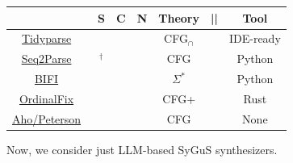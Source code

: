 \documentclass[runningheads]{llncs}
\newcommand{\cmark}{\ding{51}}%
\newcommand{\xmark}{\ding{55}}%
\begin{document}
\newcommand{\tidyparse}{\href{https://arxiv.org/pdf/2408.01849}{Tidyparse}~\cite{considine2023pragmatic}}
\newcommand{\seqtoparse}{\href{https://pg.ucsd.edu/publications/Seq2Parse-neurosymbolic-parse-error-repair_OOPSLA-2022.pdf}{Seq2Parse}~\cite{sakkas2022seq2parse}}
\newcommand{\bifi}{\href{https://arxiv.org/pdf/2106.06600}{BIFI}~\cite{yasunaga2021break}}
\newcommand{\ordinalfix}{\href{https://arxiv.org/pdf/2309.06771}{OrdinalFix}~\cite{zhang2023ordinalfix}}
\newcommand{\ahopeterson}{\href{https://epubs.siam.org/doi/10.1137/0201022}{Aho/Peterson}~\cite{aho1972minimum}}

\begin{table}[h]
  \begin{tabular}{c|cccccc}
    & \textbf{S}       & \textbf{C} & \textbf{N} & \textbf{Theory} & ||     & \textbf{Tool} \\\hline
    \tidyparse   & \cmark           & \cmark & \cmark & CFG$_\cap$      & \cmark & IDE-ready     \\
    \seqtoparse  & \cmark$^\dagger$ & \xmark & \cmark & CFG             & \xmark & Python        \\
    \bifi        & \xmark           & \xmark & \cmark & $\Sigma^*$      & \xmark & Python        \\
    \ordinalfix  & \cmark           & \xmark & \xmark & CFG+            & \xmark & Rust          \\
    \ahopeterson & \cmark           & \xmark & \xmark & CFG             & \xmark & None          \\
  \end{tabular}
\end{table}

Now, we consider just LLM-based SyGuS synthesizers.

\newcommand{\outlines}{\href{https://arxiv.org/pdf/2307.09702}{Outlines}~\cite{willard2023efficient}}
\newcommand{\syncode}{\href{https://arxiv.org/pdf/2403.01632}{SynCode}~\cite{ugare2024improving}}
\newcommand{\gad}{\href{https://arxiv.org/pdf/2405.21047}{GAD}~\cite{park2024grammar}}
\newcommand{\codeguard}{\href{https://arxiv.org/pdf/2405.00218}{CodeGuard+}~\cite{fu2024constrained}}
\newcommand{\flap}{\href{https://arxiv.org/pdf/2403.05766}{FLAP}~\cite{roy2024flap}}
\newcommand{\domino}{\href{https://arxiv.org/pdf/2403.06988}{DOMINO}~\cite{beurer2024guiding}}
\end{document}
